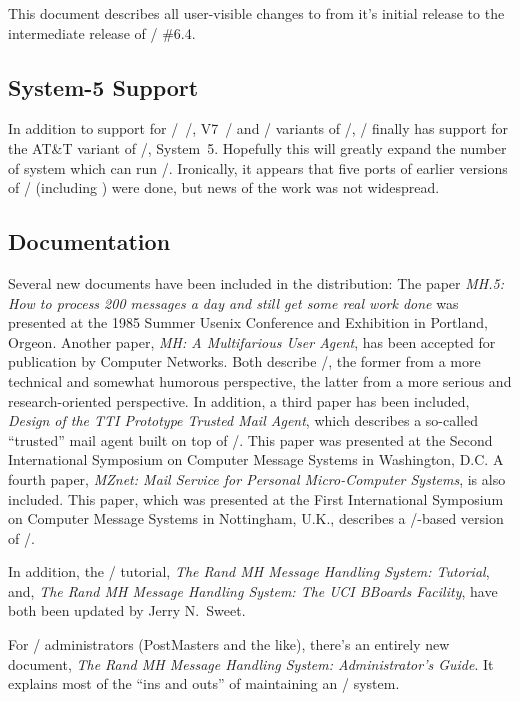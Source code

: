 This document describes all user-visible changes to  from it's initial
release to the intermediate release of \MH/ \#6.4.

\subsection*	{System-5 Support}
In addition to support for \bsd/~\unix/, V7~\unix/ and \xenix/ variants of
\unix/,
\MH/ finally has support for the AT\&T variant of \unix/, System~5.
Hopefully this will greatly expand the number of system which can run \MH/.
Ironically,
it appears that five ports of earlier versions of \MH/ (including )
were done,
but news of the work was not widespread.%

\subsection*	{Documentation}
Several new documents have been included in the  distribution:
The paper {\em MH.5: How to process 200 messages a day and still get some
real work done}
was presented at the 1985 Summer Usenix Conference and Exhibition in
Portland, Orgeon.
Another paper, {\em MH: A Multifarious User Agent},
has been accepted for publication by Computer Networks.
Both describe \MH/,
the former from a more technical and somewhat humorous perspective,
the latter from a more serious and research-oriented perspective.
In addition,
a third paper has been included,
{\em Design of the TTI Prototype Trusted Mail Agent},
which describes a so-called ``trusted'' mail agent built on top of \MH/.
This paper was presented at the Second International Symposium on
Computer Message Systems in Washington, D.C.
A fourth paper,
{\em MZnet: Mail Service for Personal Micro-Computer Systems},
is also included.
This paper,
which was presented at the First International Symposium on Computer Message
Systems in Nottingham, U.K.,
describes a \cpm/-based version of \MH/.

In addition,
the \MH/ tutorial, {\em The Rand MH Message Handling System: Tutorial},
and,
{\em The Rand MH Message Handling System: The UCI BBoards Facility},
have both been updated by Jerry N.~Sweet.

For \MH/ administrators (PostMasters and the like),
there's an entirely new document,
{\em The Rand MH Message Handling System: Administrator's Guide}.
It explains most of the ``ins and outs'' of maintaining an \MH/ system.

